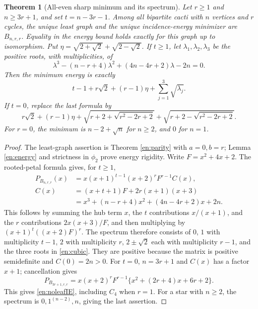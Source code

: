 \documentclass[12pt]{amsart}
\newtheorem{thm}{Theorem}[section]
\theoremstyle{definition}
\theoremstyle{remark}
\numberwithin{equation}{section}
\begin{document}
\begin{thm}[All-even sharp minimum and its spectrum]\label{en:evenenergy}
Let $r\ge1$ and $n\ge3r+1$, and set $t=n-3r-1$. Among all bipartite
cacti with $n$ vertices and $r$ cycles, the unique least graph and the
unique incidence-energy minimizer are $B_{n,r,r}$. Equality in the energy
bound holds exactly for this graph up to isomorphism.
Put $\eta=\sqrt{2+\sqrt2}+\sqrt{2-\sqrt2}$.
If $t\ge1$, let $\lambda_1,\lambda_2,\lambda_3$ be the positive roots,
with multiplicities, of
\begin{equation}\label{en:cubic}
 \lambda^3-(n-r+4)\lambda^2+(4n-4r+2)\lambda-2n=0.
\end{equation}
Then the minimum energy is exactly
\begin{equation}\label{en:evenIE}
 t-1+r\sqrt2+(r-1)\eta+\sum_{j=1}^3\sqrt{\lambda_j}.
\end{equation}
If $t=0$, replace the last formula by
\begin{equation}\label{en:noleafIE}
 r\sqrt2+(r-1)\eta+
 \sqrt{r+2+\sqrt{r^2-2r+2}}+
 \sqrt{r+2-\sqrt{r^2-2r+2}}.
\end{equation}
For $r=0$, the minimum is $n-2+\sqrt n$ for $n\ge2$, and $0$ for $n=1$.
\end{thm}
\begin{proof}
The least-graph assertion is Theorem \ref{en:parity} with $a=0,b=r$;
Lemma \ref{en:energy} and strictness in $\phi_2$ prove energy rigidity.
Write $F=x^2+4x+2$. The rooted-petal formula gives, for $t\ge1$,
\begin{align}
 P_{B_{n,r,r}}(x)
 &=x(x+1)^{t-1}(x+2)^rF^{r-1}C(x),\label{en:factor}\\
 C(x)&=(x+t+1)F+2r(x+1)(x+3)\nonumber\\
 &=x^3+(n-r+4)x^2+(4n-4r+2)x+2n.\nonumber
\end{align}
This follows by summing the hub term $x$, the $t$ contributions
$x/(x+1)$, and the $r$ contributions $2x(x+3)/F$, and then multiplying
by $(x+1)^t((x+2)F)^r$.
The spectrum therefore consists of $0$, $1$ with multiplicity $t-1$,
$2$ with multiplicity $r$, $2\pm\sqrt2$ each with multiplicity $r-1$,
and the three roots in \eqref{en:cubic}. They are positive because the
matrix is positive semidefinite and $C(0)=2n>0$.
For $t=0$, $n=3r+1$ and $C(x)$ has a factor $x+1$; cancellation gives
\[
 P_{B_{3r+1,r,r}}
 =x(x+2)^rF^{r-1}\{x^2+(2r+4)x+6r+2\}.
\]
This gives \eqref{en:noleafIE}, including $C_4$ when $r=1$.
For a star with $n\ge2$, the spectrum is $0,1^{(n-2)},n$, giving the
last assertion.
\end{proof}
\end{document}
